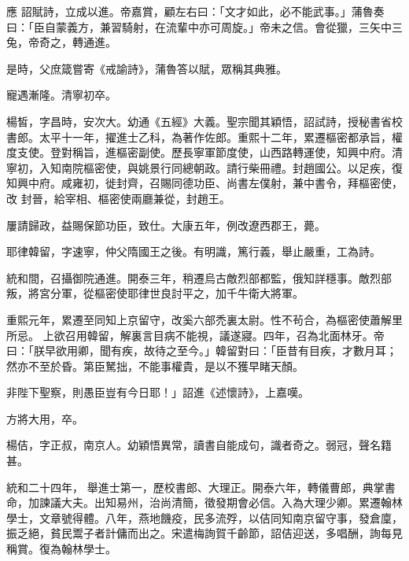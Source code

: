 \begin{pinyinscope}
 應
 詔賦詩，立成以進。帝嘉賞，顧左右曰：「文才如此，必不能武事。」蒲魯奏曰：「臣自蒙義方，兼習騎射，在流輩中亦可周旋。」帝未之信。會從獵，三矢中三兔，帝奇之，轉通進。



 是時，父庶箴嘗寄《戒諭詩》，蒲魯答以賦，眾稱其典雅。



 寵遇漸隆。清寧初卒。



 楊皙，字昌時，安次大。幼通《五經》大義。聖宗聞其穎悟，詔試詩，授秘書省校書郎。太平十一年，擢進士乙科，為著作佐郎。重熙十二年，累遷樞密都承旨，權度支使。登對稱旨，進樞密副使。歷長寧軍節度使，山西路轉運使，知興中府。清寧初，入知南院樞密使，與姚景行同總朝政。請行柴冊禮。封趙國公。以足疾，復知興中府。咸雍初，徙封齊，召賜同德功臣、尚書左僕射，兼中書令，拜樞密使，改
 封晉，給宰相、樞密使兩廳兼從，封趙王。



 屢請歸政，益賜保節功臣，致仕。大康五年，例改遼西郡王，薨。



 耶律韓留，字速寧，仲父隋國王之後。有明識，篤行義，舉止嚴重，工為詩。



 統和間，召攝御院通進。開泰三年，稍遷烏古敵烈部都監，俄知詳穩事。敵烈部叛，將宮分軍，從樞密使耶律世良討平之，加千牛衛大將軍。



 重熙元年，累遷至同知上京留守，改奚六部禿裏太尉。性不茍合，為樞密使蕭解里所忌。
 上欲召用韓留，解裏言目病不能視，議遂寢。四年，召為北面林牙。帝曰：「朕早欲用卿，聞有疾，故待之至今。」韓留對曰：「臣昔有目疾，才數月耳；然亦不至於昏。第臣駑拙，不能事權貴，是以不獲早睹天顏。



 非陛下聖察，則愚臣豈有今日耶！」詔進《述懷詩》，上嘉嘆。



 方將大用，卒。



 楊佶，字正叔，南京人。幼穎悟異常，讀書自能成句，識者奇之。弱冠，聲名籍甚。



 統和二十四年，
 舉進士第一，歷校書郎、大理正。開泰六年，轉儀曹郎，典掌書命，加諫議大夫。出知易州，治尚清簡，徵發期會必信。入為大理少卿。累遷翰林學士，文章號得體。八年，燕地饑疫，民多流殍，以佶同知南京留守事，發倉廩，振乏絕，貧民鬻子者計傭而出之。宋遣梅詢賀千齡節，詔佶迎送，多唱酬，詢每見稱賞。復為翰林學士。




\end{pinyinscope}
